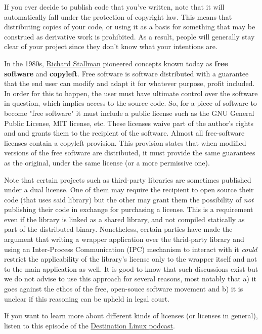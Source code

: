 If you ever decide to publish code that you've written, note that it will
automatically fall under the protection of copyright law. This means that
distributing copies of your code, or using it as a basis for something that may
be construed as derivative work is prohibited. As a result, people will
generally stay clear of your project since they don't know what your intentions
are.

In the 1980s, \href{https://www.youtube.com/watch?v=jUibaPTXSHk}{Richard
Stallman} pioneered concepts known today as \textbf{free software} and
\textbf{copyleft}. Free software is software distributed with a guarantee that
the end user can modify and adapt it for whatever purpose, profit included. In
order for this to happen, the user must have ultimate control over the software
in question, which implies access to the source code. So, for a piece of
software to become "free software" it must include a public license such as the
GNU General Public License, MIT license, etc. These licenses waive part of the
author's rights and and grants them to the recipient of the software. Almost all
free-software licenses contain a copyleft provision. This provision states that
when modified versions of the free software are distributed, it must provide
the same guarantees as the original, under the same license (or a more
permissive one).

Note that certain projects such as third-party libraries are sometimes published
under a dual license. One of them may require the recipient to open source their
code (that uses said library) but the other may grant them the possibility of
\textit{not} publishing their code in exchange for purchasing a license. This is
a requirement even if the library is linked as a shared library, and not
compiled statically as part of the distributed binary. Nonetheless, certain
parties have made the argument that writing a wrapper application over the
thrid-party library and using an Inter-Process Communication (IPC) mechanism
to interact with it \textit{could} restrict the applicability of the library's
license only to the wrapper itself and not to the main application as well.
It is good to know that such discussions exist but we do not advise to use this
approach for several reasons, most notably that a) it goes against the ethos of
the free, open-souce software movement and b) it is unclear if this reasoning
can be upheld in legal court.

If you want to learn more about different kinds of licenses (or licenses in
general), listen to this episode of the
\href{https://www.youtube.com/watch?v=dsm1SKqVsTQ&t=406s}{Destination Linux
podcast}.
